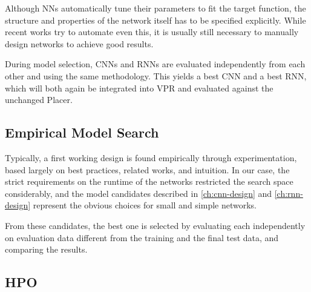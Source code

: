 Although \glspl{NN} automatically tune their parameters to fit the target function, the structure and properties of the network itself has to be specified explicitly. While recent works try to automate even this, it is usually still necessary to manually design networks to achieve good results.

During model selection, \glspl{CNN} and \glspl{RNN} are evaluated independently from each other and using the same methodology. This yields a best \gls{CNN} and a best \gls{RNN}, which will both again be integrated into \gls{VPR} and evaluated against the unchanged Placer.  

\subsection{Empirical Model Search}

Typically, a first working design is found empirically through experimentation, based largely on best practices, related works, and intuition. In our case, the strict requirements on the runtime of the networks restricted the search space considerably, and the model candidates described in \ref{ch:cnn-design} and \ref{ch:rnn-design} represent the obvious choices for small and simple networks.

From these candidates, the best one is selected by evaluating each independently on evaluation data different from the training and the final test data, and comparing the results.

\subsection{\gls{HPO}}

